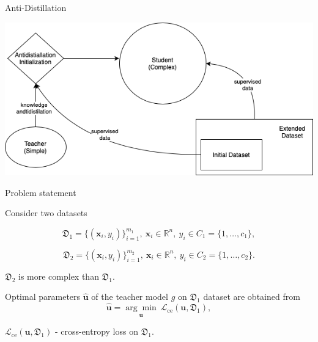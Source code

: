 \documentclass[dvipsnames,aspectratio=169]{beamer}
\begin{document}
\begin{frame}{Anti-Distillation}
    
    \begin{center}
        \includegraphics[width=\textwidth]{figures/andtidistilation.png}
    \end{center}

\end{frame}


\begin{frame}{Problem statement}

    Consider two datasets
    
    $$\mathfrak{D}_1 = \{(\mathbf{x}_i, y_i)\}_{i=1}^{m_1},~\mathbf{x}_i \in \mathbb{R}^{n},~y_i \in C_1 = \{1, \dots, c_1\},$$

    $$\mathfrak{D}_2 =  \{(\mathbf{x}_i, y_i)\}_{i=1}^{m_2},~\mathbf{x}_i \in \mathbb{R}^{n},~y_i \in C_2 = \{1, \dots, c_2\}.$$
    
    $\mathfrak{D}_2$ is more complex than $\mathfrak{D}_1$.
    \bigskip
    
    Optimal parameters $\hat{\textbf{u}}$ of the teacher model $g$ on $\mathfrak{D}_1$ dataset are obtained from 
    $$\hat{\mathbf{u}} =  \underset{\mathbf{u}}{\arg\min}~\mathcal{L}_\text{ce}(\mathbf{u}, \mathfrak{D}_1) ,$$
    
    $\mathcal{L}_\text{ce}(\mathbf{u}, \mathfrak{D}_1)$ - cross-entropy loss on $\mathfrak{D}_1$.

\end{frame}

\end{document}

